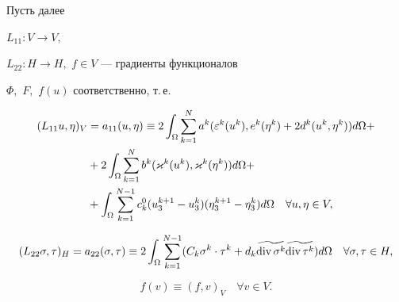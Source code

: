 Пусть далее 


$L_{11}:V \to V,$


$L_{22}:H \to H,$ $f \in V$ --- градиенты функционалов


$\Phi ,$ $F,$ $ f(u) $ со\-от\-вет\-ст\-вен\-но, т.\,е. 


%


\begin{align}


\label{a11}


(L_{11}u,\eta )_{V} &= a_{11}(u,\eta ) \equiv


2 \int _{\Omega } \sum ^{N}_{k=1} 


a^{k}(\varepsilon ^{k}(u^{k}),e^{k}


(\eta ^{k})+2d^{k}(u^{k},\eta ^{k})) d\Omega +\notag\\


&+ 2 \int _{\Omega } \sum ^{N}_{k=1} b^{k}(\varkappa ^{k}


(u^{k}),\varkappa ^{k}(\eta ^{k})) d\Omega +\notag\\


&+ \int _{\Omega } \sum ^{N-1}_{k=1}


c_k^0 (u_3^{k+1}- u_3^k)(\eta^{k+1}_3 - \eta^k_3)


d\Omega \quad \forall u,\eta \in V,


\end{align}


%


\begin{gather}


\label{a22}


(L_{22} \sigma,\tau )_H = a_{22}(\sigma,\tau ) \equiv


2\int _{\Omega } \sum_{k=1}^{N-1}(C_{k} \sigma^k \cdot \tau^k + 


d_k \widetilde {\divv \sigma^k } \widetilde {\divv \tau^k }) 


d \Omega \quad \forall \sigma, \tau \in H,


\end{gather}


$$


f(v) \equiv (f,v)_V \quad \forall v \in V.


$$


